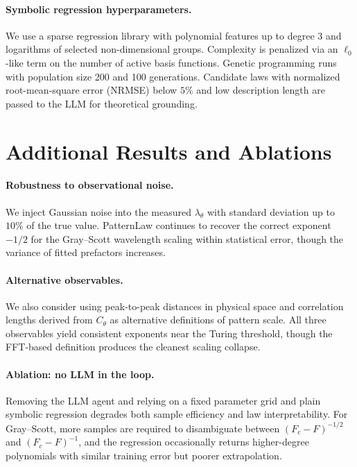 \documentclass{article}
\theoremstyle{plain}
\theoremstyle{definition}
\theoremstyle{remark}
\begin{document}
\paragraph{Symbolic regression hyperparameters.}
We use a sparse regression library with polynomial features up to degree 3 and logarithms of selected non-dimensional groups. Complexity is penalized via an $\ell_0$-like term on the number of active basis functions. Genetic programming runs with population size 200 and 100 generations. Candidate laws with normalized root-mean-square error (NRMSE) below $5\%$ and low description length are passed to the LLM for theoretical grounding.

\section{Additional Results and Ablations}
\label{app:extra_results}

\paragraph{Robustness to observational noise.}
We inject Gaussian noise into the measured $\lambda_\theta$ with standard deviation up to $10\%$ of the true value. PatternLaw continues to recover the correct exponent $-1/2$ for the Gray--Scott wavelength scaling within statistical error, though the variance of fitted prefactors increases.

\paragraph{Alternative observables.}
We also consider using peak-to-peak distances in physical space and correlation lengths derived from $C_\theta$ as alternative definitions of pattern scale. All three observables yield consistent exponents near the Turing threshold, though the FFT-based definition produces the cleanest scaling collapse.

\paragraph{Ablation: no LLM in the loop.}
Removing the LLM agent and relying on a fixed parameter grid and plain symbolic regression degrades both sample efficiency and law interpretability. For Gray--Scott, more samples are required to disambiguate between $(F_c-F)^{-1/2}$ and $(F_c-F)^{-1}$, and the regression occasionally returns higher-degree polynomials with similar training error but poorer extrapolation.
\end{document}

